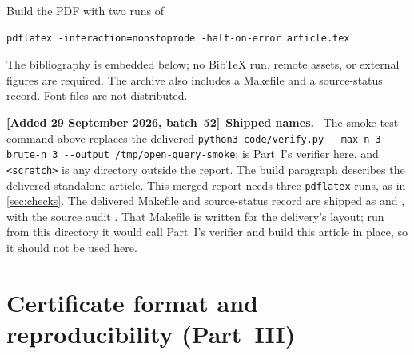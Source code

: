 \documentclass[11pt,letterpaper]{article}
\numberwithin{equation}{section}
\theoremstyle{definition}
\theoremstyle{remark}
\theoremstyle{definition}
\newenvironment{writenote}[1][]{\par\smallskip\begingroup\small\sloppy
 \noindent\textbf{[Added 29 September 2026, batch~52]}\if\relax\detokenize{#1}\relax\else~\textbf{#1.}\fi\ }%
 {\par\endgroup\smallskip}
\begin{document}
Build the PDF with two runs of
\begin{lstlisting}
pdflatex -interaction=nonstopmode -halt-on-error article.tex
\end{lstlisting}
The bibliography is embedded below; no BibTeX run, remote assets, or external
figures are required. The archive also includes a Makefile and a source-status
record. Font files are not distributed.

\begin{writenote}[Shipped names]
The smoke-test command above replaces the delivered
\texttt{python3 code/verify.py -{}-max-n 3 -{}-brute-n 3 -{}-output /tmp/open-query-smoke}:
 is Part~I's verifier here, and \texttt{<scratch>} is any
directory outside the report. The build paragraph describes the delivered
standalone article. This merged report needs three \texttt{pdflatex} runs, as
in \cref{sec:checks}. The delivered Makefile and source-status record are
shipped as  and
, with the source audit
. That Makefile is written for the
delivery's layout; run from this directory it would call Part~I's verifier and
build this article in place, so it should not be used here.
\end{writenote}

\section{Certificate format and reproducibility (Part~III)}
\label{fp:app:certificates}
\end{document}
